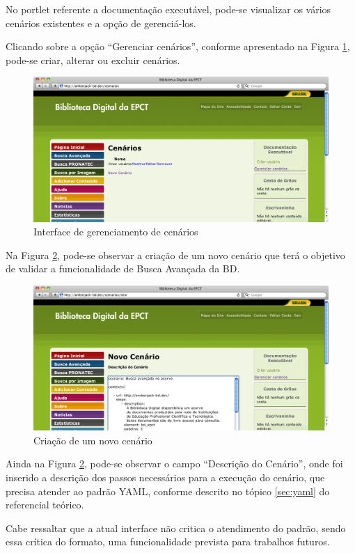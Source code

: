 No portlet referente a documentação executável, pode-se visualizar os vários cenários existentes e a opção de gerenciá-los.

\pagebreak
Clicando sobre a opção “Gerenciar cenários”, conforme apresentado na Figura \ref{tour_2}, pode-se criar, alterar ou excluir cenários.

\begin{figure}[ht]
    \centering
    \includegraphics[width=0.9 \textwidth]{figuras/tour_2}
    \caption{Interface de gerenciamento de cenários}
    \label{tour_2}
\end{figure}

Na Figura \ref{tour_3}, pode-se observar a criação de um novo cenário que terá o objetivo de validar a funcionalidade de Busca Avançada da BD.

\begin{figure}[ht]
    \centering
    \includegraphics[width=0.9 \textwidth]{figuras/tour_3}
    \caption{Criação de um novo cenário}
    \label{tour_3}
\end{figure}

Ainda na Figura \ref{tour_3}, pode-se observar o campo “Descrição do Cenário”, onde foi inserido a descrição dos passos necessários para a execução do cenário, que precisa atender ao padrão YAML, conforme descrito no  tópico \ref{sec:yaml} do referencial teórico.

Cabe ressaltar que a atual interface não critica o atendimento do padrão, sendo essa crítica do formato, uma funcionalidade prevista para  trabalhos futuros.

